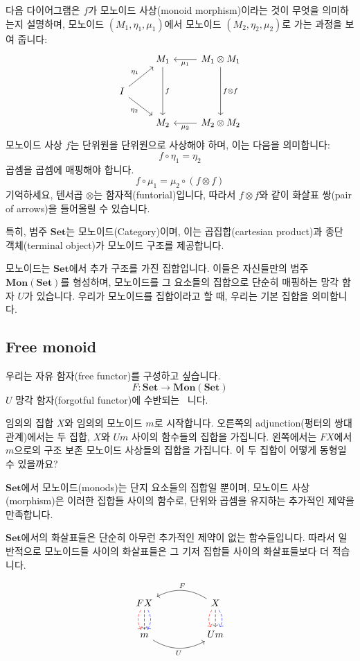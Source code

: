 \documentclass[DaoFP]{subfiles}
\begin{document}
다음 다이어그램은 $f$가 모노이드 사상(monoid morphism)이라는 것이 무엇을 의미하는지 설명하며, 모노이드 $(M_1, \eta_1, \mu_1)$에서 모노이드 $(M_2, \eta_2, \mu_2)$로 가는 과정을 보여 줍니다:
\[
 \begin{tikzcd}
 & M_1
 \arrow[dd, "f"]
 & M_1 \otimes M_1
 \arrow[l, "\mu_1"]
 \arrow[dd, "f \otimes f"]
 \\
 I
 \arrow[ru, "\eta_1"]
 \arrow[rd, "\eta_2"']
 \\
 & M_2
 & M_2 \otimes M_2
 \arrow[l, "\mu_2"]
  \end{tikzcd}
\]
모노이드 사상 $f$는 단위원을 단위원으로 사상해야 하며, 이는 다음을 의미합니다:
\[ f \circ \eta_1 = \eta_2 \]
곱셈을 곱셈에 매핑해야 합니다.
\[ f \circ \mu_1 = \mu_2 \circ (f \otimes f)\]
기억하세요, 텐서곱 $\otimes$는 함자적(funtorial)입니다, 따라서 $f \otimes f$와 같이 화살표 쌍(pair of arrows)을 들어올릴 수 있습니다.

특히, 범주 $\mathbf{Set}$는 모노이드(Category)이며, 이는 곱집합(cartesian product)과 종단 객체(terminal object)가 모노이드 구조를 제공합니다.

모노이드는 $\mathbf{Set}$에서 추가 구조를 가진 집합입니다. 이들은 자신들만의 범주 $\mathbf{Mon}(\mathbf{Set})$를 형성하며, 모노이드를 그 요소들의 집합으로 단순히 매핑하는 망각 함자 $U$가 있습니다. 우리가 모노이드를 집합이라고 할 때, 우리는 기본 집합을 의미합니다.

\subsection{Free monoid}

우리는 자유 함자(free functor)를 구성하고 싶습니다.
\[ F \colon \mathbf{Set} \to \mathbf{Mon}(\mathbf{Set})\]
$U$ 망각 함자(forgotful functor)에 수반되는 ~니다.

임의의 집합 $X$와 임의의 모노이드 $m$로 시작합니다. 오른쪽의 adjunction(펑터의 쌍대 관계)에서는 두 집합, $X$와 $U m$ 사이의 함수들의 집합을 가집니다. 왼쪽에서는 $F X$에서 $m$으로의 구조 보존 모노이드 사상들의 집합을 가집니다. 이 두 집합이 어떻게 동형일 수 있을까요?

$\mathbf{Set}$에서 모노이드(monods)는 단지 요소들의 집합일 뿐이며, 모노이드 사상(morphism)은 이러한 집합들 사이의 함수로, 단위와 곱셈을 유지하는 추가적인 제약을 만족합니다.

$\mathbf{Set}$에서의 화살표들은 단순히 아무런 추가적인 제약이 없는 함수들입니다. 따라서 일반적으로 모노이드들 사이의 화살표들은 그 기저 집합들 사이의 화살표들보다 더 적습니다.

\[
 \begin{tikzcd}
F X
\arrow[d, bend right, red, dashed]
\arrow[d, dashed]
\arrow[d, bend left, blue, dashed]
  &&
X
\arrow[d, bend right, red, dashed]
\arrow[d, dashed]
\arrow[d, bend left, blue, dashed]
 \arrow[ll, bend right, "F"']
 \\
m
   \arrow[rr, bend right, "U"']
 &&
 U m
  \end{tikzcd}
\]
\end{document}
